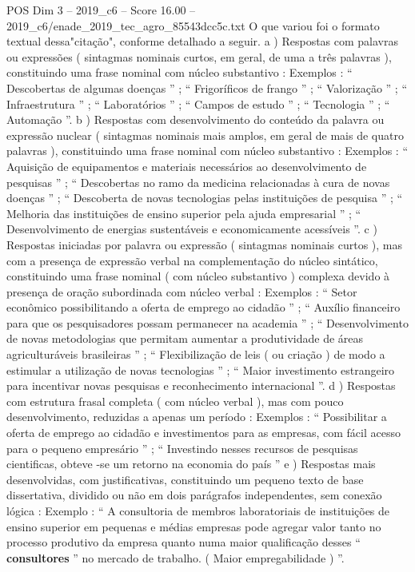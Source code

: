 \begin{textsample}{POS Dim 3 – 2019\_c6 – Score 16.00 – 2019\_c6/enade\_2019\_tec\_agro\_85543dcc5c.txt}
O que variou foi o formato textual dessa"citação", conforme detalhado a seguir. a ) Respostas com palavras ou expressões ( sintagmas nominais curtos, em geral, de uma a três palavras ), constituindo uma frase nominal com núcleo substantivo : Exemplos : “ Descobertas de algumas doenças ” ; “ Frigoríficos de frango ” ; “ Valorização ” ; “ Infraestrutura ” ; “ Laboratórios ” ; “ Campos de estudo ” ; “ Tecnologia ” ; “ Automação ”. b ) Respostas com desenvolvimento do conteúdo da palavra ou expressão nuclear ( sintagmas nominais mais amplos, em geral de mais de quatro palavras ), constituindo uma frase nominal com núcleo substantivo : Exemplos : “ Aquisição de equipamentos e materiais necessários ao desenvolvimento de pesquisas ” ; “ Descobertas no ramo da medicina relacionadas à cura de novas doenças ” ; “ Descoberta de novas tecnologias pelas instituições de pesquisa ” ; “ Melhoria das instituições de ensino superior pela ajuda empresarial ” ; “ Desenvolvimento de energias sustentáveis e economicamente acessíveis ”. c ) Respostas iniciadas por palavra ou expressão ( sintagmas nominais curtos ), mas com a presença de expressão verbal na complementação do núcleo sintático, constituindo uma frase nominal ( com núcleo substantivo ) complexa devido à presença de oração subordinada com núcleo verbal : Exemplos : “ Setor econômico possibilitando a oferta de emprego ao cidadão ” ; “ Auxílio financeiro para que os pesquisadores possam permanecer na academia ” ; “ Desenvolvimento de novas metodologias que permitam aumentar a produtividade de áreas agriculturáveis brasileiras ” ; “ Flexibilização de leis ( ou criação ) de modo a estimular a utilização de novas tecnologias ” ; “ Maior investimento estrangeiro para incentivar novas pesquisas e reconhecimento internacional ”. d ) Respostas com estrutura frasal completa ( com núcleo verbal ), mas com pouco desenvolvimento, reduzidas a apenas um período : Exemplos : “ Possibilitar a oferta de emprego ao cidadão e investimentos para as empresas, com fácil acesso para o pequeno empresário ” ; “ Investindo nesses recursos de pesquisas cientificas, obteve -se um retorno na economia do país ” e ) Respostas mais desenvolvidas, com justificativas, constituindo um pequeno texto de base dissertativa, dividido ou não em dois parágrafos independentes, sem conexão lógica : Exemplo : “ A consultoria de membros laboratoriais de instituições de ensino superior em pequenas e médias empresas pode agregar valor tanto no processo produtivo da empresa quanto numa maior qualificação desses “ \textbf{consultores} ” no mercado de trabalho. ( Maior empregabilidade ) ”.

\end{textsample}
